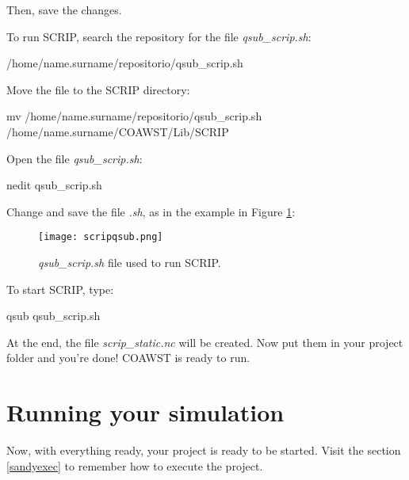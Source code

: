 \noindent Then, save the changes.
\bigskip

\noindent To run SCRIP, search the repository for the file \textit{qsub\_scrip.sh}:
\bigskip

\begin{bashcode}
/home/name.surname/repositorio/qsub_scrip.sh
\end{bashcode}
\bigskip

\noindent Move the file to the SCRIP directory:
\bigskip

\begin{bashcode}[fontsize=\scriptsize]
mv /home/name.surname/repositorio/qsub_scrip.sh /home/name.surname/COAWST/Lib/SCRIP
\end{bashcode}
\bigskip

\noindent Open the file \textit{qsub\_scrip.sh}:
\bigskip

\begin{bashcode}
nedit qsub_scrip.sh
\end{bashcode}
\bigskip

\noindent Change and save the file \textit{.sh}, as in the example in Figure \textcolor{bleu_cite}{\ref{qsubscripsh}}:
\bigskip

\begin{figure}[H]
    \centering
    \texttt{[image: scripqsub.png]}
    \caption{\textit{qsub\_scrip.sh} file used to run SCRIP.}
    \label{qsubscripsh}
\end{figure}
\bigskip

\noindent To start SCRIP, type:
\bigskip

\begin{bashcode}
qsub qsub_scrip.sh
\end{bashcode}
\bigskip

\noindent At the end, the file \textit{scrip\_static.nc} will be created. Now put them in your project folder and you're done! COAWST is ready to run.
\bigskip

\section{Running your simulation}{{{{ }}}}
\bigskip

\noindent Now, with everything ready, your project is ready to be started. Visit the section \textcolor{bleu_cite}{\ref{sandyexec}} to remember 
how to execute the project.